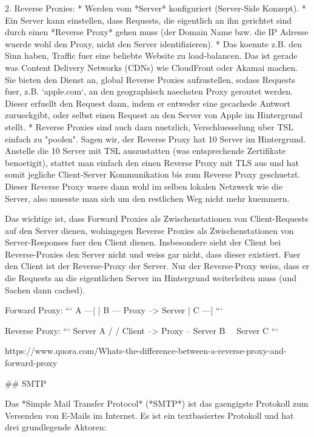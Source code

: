 2. Reverse Proxies:
   * Werden vom *Server* konfiguriert (Server-Side Konzept).
   * Ein Server kann einstellen, dass Requests, die eigentlich an ihn gerichtet
     sind durch einen *Reverse Proxy* gehen muss (der Domain Name bzw. die IP
     Adresse wuerde wohl den Proxy, nicht den Server identifizieren).
   * Das koennte z.B. den Sinn haben, Traffic fuer eine beliebte Website zu
     load-balancen. Das ist gerade was Content Delivery Networks (CDNs) wie
     CloudFront oder Akamai machen. Sie bieten den Dienst an, global Reverse
     Proxies aufzustellen, sodass Requests fuer, z.B. `apple.com`, an den
     geographisch naechsten Proxy geroutet werden. Dieser erfuellt den Request
     dann, indem er entweder eine gecachede Antwort zurueckgibt, oder selbst
     einen Request an den Server von Apple im Hintergrund stellt.
   * Reverse Proxies sind auch dazu nuetzlich, Verschluesselung uber TSL einfach
     zu "poolen". Sagen wir, der Reverse Proxy hat 10 Server im
     Hintergrund. Anstelle die 10 Server mit TSL auszustatten (was entsprechende
     Zertifikate benoetigit), stattet man einfach den einen Reverse Proxy mit
     TLS aus und hat somit jegliche Client-Server Kommunikation bis zum Reverse
     Proxy geschuetzt. Dieser Reverse Proxy waere dann wohl im selben lokalen
     Netzwerk wie die Server, also muesste man sich um den restlichen Weg nicht
     mehr kuemmern.

Das wichtige ist, dass Forward Proxies als Zwischenstationen von Client-Requests
auf den Server dienen, wohingegen Reverse Proxies als Zwischenstationen von
Server-Responses fuer den Client dienen. Insbesondere sieht der Client bei
Reverse-Proxies den Server nicht und weiss gar nicht, dass dieser
existiert. Fuer den Client ist der Reverse-Proxy der Server. Nur der
Reverse-Proxy weiss, dass er die Requests an die eigentlichen Server im
Hintergrund weiterleiten muss (und Sachen dann cached).

Forward Proxy:
```
A ---|
     |
B --- Proxy --> Server
     |
C ---|
```

Reverse Proxy:
```
                    Server A
                  /
                 /
Client --> Proxy -- Server B
                 \
				  \ Server C
```

https://www.quora.com/Whats-the-difference-between-a-reverse-proxy-and-forward-proxy

## SMTP

Das *Simple Mail Transfer Protocol* (*SMTP*) ist das gaengigste Protokoll zum
Versenden von E-Mails im Internet. Es ist ein textbasiertes Protokoll und hat
drei grundlegende Aktoren:

